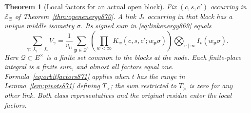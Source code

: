 \documentclass[a4paper,11pt]{article}
\newtheorem{theorem}[proposition]{Theorem}
\theoremstyle{definition}
\theoremstyle{remark}
\numberwithin{equation}{section}
\begin{document}
\begin{theorem}[Local factors for an actual open block]
\leavevmode\label{thm:orbitfactors871}
Fix \((c,s,c')\) occurring in \(\mathcal E_\Xi\) of
Theorem~\ref{thm:openenergy870}. A link \(J_*\) occurring in
that block has a unique middle isometry \(\sigma\). Its signed
sum in \eqref{eq:linkenergy869} equals
\begin{equation}
 \sum_{\gamma:\,J_\gamma=J_*} V_\gamma
   =\frac{1}{v_U}\sum_{\mathbf p\in\mathcal Q^a}
       \left(\prod_{w<\infty}K_w(c,s,c';w_{\mathbf p}\sigma)\right)
       \bigotimes_{v\mid\infty} I_v(w_{\mathbf p}\sigma).
 \label{eq:orbitfactors871}
\end{equation}
Here \(\mathcal Q\subset E^\times\) is a finite set common to the
blocks at the node. Each finite-place integral is a finite sum,
and almost all factors equal one. Formula~\eqref{eq:orbitfactors871}
applies when \(t\) has the range in Lemma~\ref{lem:pivots871}
defining \(T_>\); the sum restricted to \(T_>\) is zero for any
other link. Both class representatives and the original residue
enter the local factors.
\end{theorem}
\end{document}
